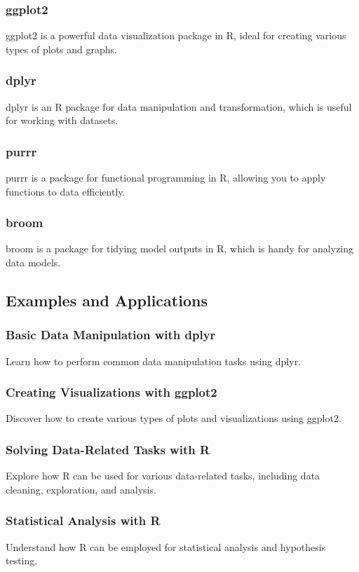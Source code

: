 \documentclass[a4paper,12pt]{book}
\begin{document}
\subsubsection*{ggplot2}
ggplot2 is a powerful data visualization package in R, ideal for creating various types of plots and graphs.

\subsubsection*{dplyr}
dplyr is an R package for data manipulation and transformation, which is useful for working with datasets.

\subsubsection*{purrr}
purrr is a package for functional programming in R, allowing you to apply functions to data efficiently.

\subsubsection*{broom}
broom is a package for tidying model outputs in R, which is handy for analyzing data models.

\subsection*{Examples and Applications}

\subsubsection*{Basic Data Manipulation with dplyr}
Learn how to perform common data manipulation tasks using dplyr.

\subsubsection*{Creating Visualizations with ggplot2}
Discover how to create various types of plots and visualizations using ggplot2.

\subsubsection*{Solving Data-Related Tasks with R}
Explore how R can be used for various data-related tasks, including data cleaning, exploration, and analysis.

\subsubsection*{Statistical Analysis with R}
Understand how R can be employed for statistical analysis and hypothesis testing.
\end{document}
